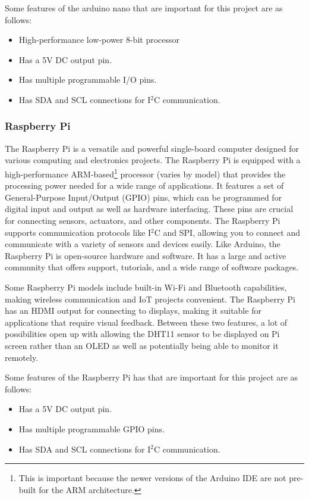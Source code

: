 \documentclass{article}
\begin{document}
\begin{multicols}{2}
		Some features of the arduino nano that are important for this project are as follows:
		\begin{itemize}[itemsep=1pt, parsep=1pt]
			\item High-performance low-power 8-bit processor
			\item Has a 5V DC output pin.
			\item Has multiple programmable I/O pins.
			\item Has SDA and SCL connections for I$^2$C communication.
		\end{itemize}
		
		\subsubsection{Raspberry Pi}
		
		The Raspberry Pi is a versatile and powerful single-board computer designed for various computing and electronics projects. The Raspberry Pi is equipped with a high-performance ARM-based\footnote{This is important because the newer versions of the Arduino IDE are not pre-built for the ARM architecture.} processor (varies by model) that provides the processing power needed for a wide range of applications. It features a set of General-Purpose Input/Output (GPIO) pins, which can be programmed for digital input and output as well as hardware interfacing. These pins are crucial for connecting sensors, actuators, and other components. The Raspberry Pi supports communication protocols like I$^2$C and SPI, allowing you to connect and communicate with a variety of sensors and devices easily. Like Arduino, the Raspberry Pi is open-source hardware and software. It has a large and active community that offers support, tutorials, and a wide range of software packages.
		
		Some Raspberry Pi models include built-in Wi-Fi and Bluetooth capabilities, making wireless communication and IoT projects convenient. The Raspberry Pi has an HDMI output for connecting to displays, making it suitable for applications that require visual feedback. Between these two features, a lot of possibilities open up with allowing the DHT11 sensor to be displayed on Pi screen rather than an OLED as well as potentially being able to monitor it remotely.
		
		Some features of the Raspberry Pi has that are important for this project are as follows:
		\begin{itemize}[itemsep=1pt, parsep=1pt]
			\item Has a 5V DC output pin.
			\item Has multiple programmable GPIO pins.
			\item Has SDA and SCL connections for I$^2$C communication.
		\end{itemize}
		

\end{multicols}
\end{document}
